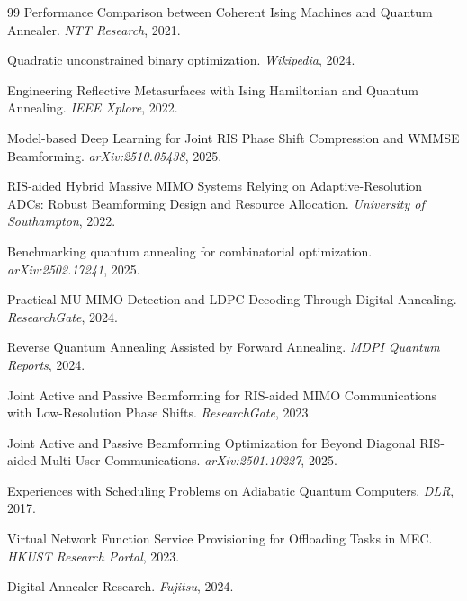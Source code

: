 \documentclass[12pt,a4paper]{article}
\begin{document}
\begin{thebibliography}{99}
Performance Comparison between Coherent Ising Machines and Quantum Annealer.
\textit{NTT Research}, 2021.

Quadratic unconstrained binary optimization.
\textit{Wikipedia}, 2024.

Engineering Reflective Metasurfaces with Ising Hamiltonian and Quantum Annealing.
\textit{IEEE Xplore}, 2022.

Model-based Deep Learning for Joint RIS Phase Shift Compression and WMMSE Beamforming.
\textit{arXiv:2510.05438}, 2025.

RIS-aided Hybrid Massive MIMO Systems Relying on Adaptive-Resolution ADCs: Robust Beamforming Design and Resource Allocation.
\textit{University of Southampton}, 2022.

Benchmarking quantum annealing for combinatorial optimization.
\textit{arXiv:2502.17241}, 2025.

Practical MU-MIMO Detection and LDPC Decoding Through Digital Annealing.
\textit{ResearchGate}, 2024.

Reverse Quantum Annealing Assisted by Forward Annealing.
\textit{MDPI Quantum Reports}, 2024.

Joint Active and Passive Beamforming for RIS-aided MIMO Communications with Low-Resolution Phase Shifts.
\textit{ResearchGate}, 2023.

Joint Active and Passive Beamforming Optimization for Beyond Diagonal RIS-aided Multi-User Communications.
\textit{arXiv:2501.10227}, 2025.

Experiences with Scheduling Problems on Adiabatic Quantum Computers.
\textit{DLR}, 2017.

Virtual Network Function Service Provisioning for Offloading Tasks in MEC.
\textit{HKUST Research Portal}, 2023.

Digital Annealer Research.
\textit{Fujitsu}, 2024.

\end{thebibliography}
\end{document}
